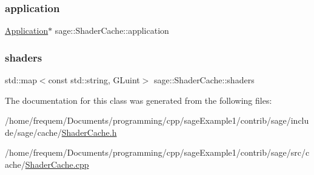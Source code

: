 \subsubsection{\texorpdfstring{application}{application}}
{\footnotesize\ttfamily \mbox{\hyperlink{classsage_1_1Application}{Application}}$\ast$ sage\+::\+Shader\+Cache\+::application\hspace{0.3cm}{\ttfamily [private]}}

\mbox{\label{classsage_1_1ShaderCache_a194bb7e1c8d2304d251cdeb52d8530df}} 
\subsubsection{\texorpdfstring{shaders}{shaders}}
{\footnotesize\ttfamily std\+::map$<$const std\+::string, G\+Luint$>$ sage\+::\+Shader\+Cache\+::shaders\hspace{0.3cm}{\ttfamily [private]}}



The documentation for this class was generated from the following files\+:\begin{DoxyCompactItemize}
\item 
/home/frequem/\+Documents/programming/cpp/sage\+Example1/contrib/sage/include/sage/cache/\mbox{\hyperlink{ShaderCache_8h}{Shader\+Cache.\+h}}\item 
/home/frequem/\+Documents/programming/cpp/sage\+Example1/contrib/sage/src/cache/\mbox{\hyperlink{ShaderCache_8cpp}{Shader\+Cache.\+cpp}}\end{DoxyCompactItemize}
